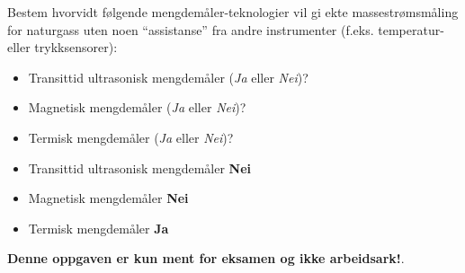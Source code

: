 

Bestem hvorvidt følgende mengdemåler-teknologier vil gi ekte massestrømsmåling for naturgass uten noen ``assistanse'' fra andre instrumenter (f.eks. temperatur- eller trykksensorer):

\begin{itemize}
\item{} Transittid ultrasonisk mengdemåler ({\it Ja} eller {\it Nei})?
\vskip 10pt
\item{} Magnetisk mengdemåler ({\it Ja} eller {\it Nei})?
\vskip 10pt
\item{} Termisk mengdemåler ({\it Ja} eller {\it Nei})?
\end{itemize}







\begin{itemize}
\item{} Transittid ultrasonisk mengdemåler {\bf Nei}
\item{} Magnetisk mengdemåler {\bf Nei}
\item{} Termisk mengdemåler {\bf Ja}
\end{itemize}







{\bf Denne oppgaven er kun ment for eksamen og ikke arbeidsark!}.

